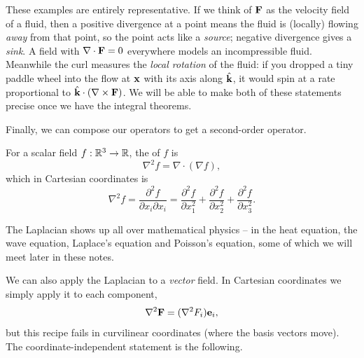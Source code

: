 \documentclass[a4paper]{scrartcl}
\begin{document}
These examples are entirely representative. If we think of $\mathbf{F}$ as the velocity field of a fluid, then a positive divergence at a point means the fluid is (locally) flowing \emph{away} from that point, so the point acts like a \emph{source}; negative divergence gives a \emph{sink}. A field with $\nabla \cdot \mathbf{F} = 0$ everywhere models an incompressible fluid. Meanwhile the curl measures the \emph{local rotation} of the fluid: if you dropped a tiny paddle wheel into the flow at $\mathbf{x}$ with its axis along $\hat{\mathbf{k}}$, it would spin at a rate proportional to $\hat{\mathbf{k}} \cdot (\nabla \times \mathbf{F})$. We will be able to make both of these statements precise once we have the integral theorems.

\begin{center}
\end{center}

Finally, we can compose our operators to get a second-order operator.

\begin{definition}[Laplacian]
	For a scalar field $f : \mathbb{R}^3 \rightarrow \mathbb{R}$, the  of $f$ is
	$$
	\nabla^2 f = \nabla \cdot (\nabla f),
	$$
	which in Cartesian coordinates is
	$$
	\nabla^2 f = \frac{\partial^2 f}{\partial x_i \partial x_i} = \frac{\partial^2 f}{\partial x_1^2} + \frac{\partial^2 f}{\partial x_2^2} + \frac{\partial^2 f}{\partial x_3^2}.
	$$
\end{definition}

The Laplacian shows up all over mathematical physics -- in the heat equation, the wave equation, Laplace's equation and Poisson's equation, some of which we will meet later in these notes.

We can also apply the Laplacian to a \emph{vector} field. In Cartesian coordinates we simply apply it to each component,
$$
\nabla^2 \mathbf{F} = (\nabla^2 F_i) \mathbf{e}_i,
$$
but this recipe fails in curvilinear coordinates (where the basis vectors move). The coordinate-independent statement is the following.
\end{document}
